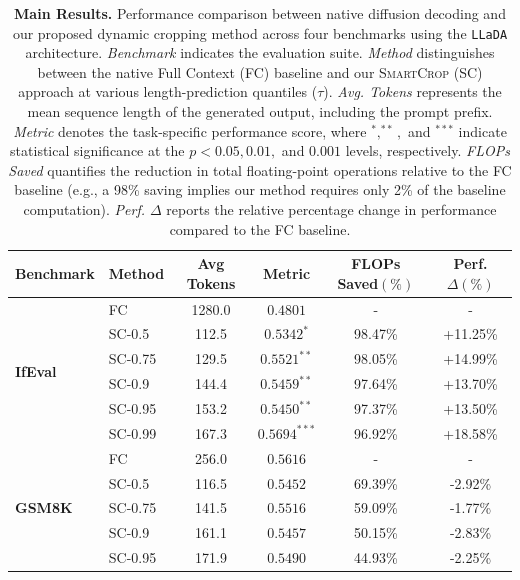 \documentclass{article}
\theoremstyle{plain}
\theoremstyle{definition}
\theoremstyle{remark}
\begin{document}
\begin{table}[t]
\centering
\small
\caption{\textbf{Main Results.} Performance comparison between native diffusion decoding and our proposed dynamic cropping method across four benchmarks using the \texttt{LLaDA} architecture. 
\textit{Benchmark} indicates the evaluation suite.
\textit{Method} distinguishes between the native Full Context (\textsc{FC}) baseline and our \textsc{SmartCrop} (\textsc{SC}) approach at various length-prediction quantiles ($\tau$). 
\textit{Avg. Tokens} represents the mean sequence length of the generated output, including the prompt prefix. 
\textit{Metric} denotes the task-specific performance score, where $^*, ^{**},$ and $^{***}$ indicate statistical significance at the $p < 0.05, 0.01,$ and $0.001$ levels, respectively. 
\textit{FLOPs Saved} quantifies the reduction in total floating-point operations relative to the \textsc{FC} baseline (e.g., a 98\% saving implies our method requires only 2\% of the baseline computation). 
\textit{Perf. $\Delta$} reports the relative percentage change in performance compared to the \textsc{FC} baseline.
}
\label{tab:main_results}
\setlength{\tabcolsep}{6pt}
\centering
\begin{tabular}{llc|ccc}
\toprule
\textbf{Benchmark} & \textbf{Method} & \textbf{Avg Tokens} & \textbf{Metric} & \textbf{FLOPs Saved${(\%)}$} & \textbf{Perf.${\Delta(\%)}$} \\
\midrule
\multirow{6}{*}{\textbf{IfEval}} & FC & 1280.0 & $0.4801$ & - & - \\
 & \textsc{SC-0.5} & 112.5 & $0.5342^{*}$ & 98.47\% & +11.25\% \\
 & \textsc{SC-0.75} & 129.5 & $0.5521^{**}$ & 98.05\% & +14.99\% \\
 & \textsc{SC-0.9} & 144.4 & $0.5459^{**}$ & 97.64\% & +13.70\% \\
 & \textsc{SC-0.95} & 153.2 & $0.5450^{**}$ & 97.37\% & +13.50\% \\
 & \textsc{SC-0.99} & 167.3 & $\bm{0.5694}^{***}$ & 96.92\% & +18.58\% \\
\midrule
\multirow{6}{*}{\textbf{GSM8K}} & FC & 256.0 & $\bm{0.5616}$ & - & - \\
 & \textsc{SC-0.5} & 116.5 & $0.5452$ & 69.39\% & -2.92\% \\
 & \textsc{SC-0.75} & 141.5 & $0.5516$ & 59.09\% & -1.77\% \\
 & \textsc{SC-0.9} & 161.1 & $0.5457$ & 50.15\% & -2.83\% \\
 & \textsc{SC-0.95} & 171.9 & $0.5490$ & 44.93\% & -2.25\% \\

\end{tabular}
\end{table}
\end{document}
